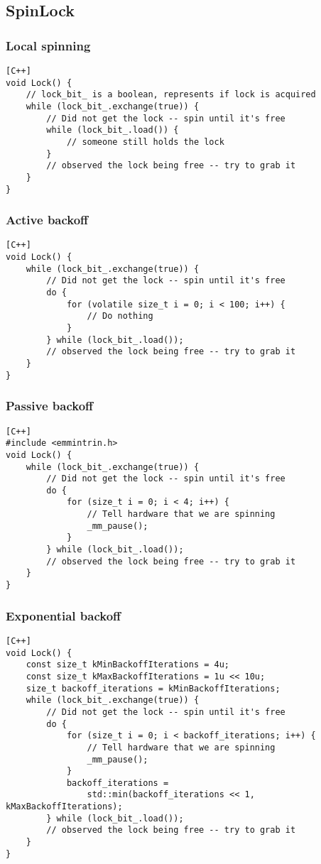 \documentclass[twocolumn,landscape,10pt]{article}
\theoremstyle{definition}
\begin{document}
\subsection{SpinLock}

\subsubsection{Local spinning}
\begin{lstlisting}[C++]
void Lock() { 
    // lock_bit_ is a boolean, represents if lock is acquired
    while (lock_bit_.exchange(true)) {
        // Did not get the lock -- spin until it's free
        while (lock_bit_.load()) {
            // someone still holds the lock
        }
        // observed the lock being free -- try to grab it
    }
}
\end{lstlisting} 
\smallskip
\subsubsection{Active backoff}
\begin{lstlisting}[C++]
void Lock() { 
    while (lock_bit_.exchange(true)) {
        // Did not get the lock -- spin until it's free
        do {
            for (volatile size_t i = 0; i < 100; i++) {
                // Do nothing
            }
        } while (lock_bit_.load());
        // observed the lock being free -- try to grab it
    }
}
\end{lstlisting} 
\smallskip
\subsubsection{Passive backoff}
\begin{lstlisting}[C++]
#include <emmintrin.h>
void Lock() { 
    while (lock_bit_.exchange(true)) {
        // Did not get the lock -- spin until it's free
        do {
            for (size_t i = 0; i < 4; i++) {
                // Tell hardware that we are spinning
                _mm_pause();
            }
        } while (lock_bit_.load());
        // observed the lock being free -- try to grab it
    }
}
\end{lstlisting} 
\smallskip
\subsubsection{Exponential backoff}
\begin{lstlisting}[C++]
void Lock() { 
    const size_t kMinBackoffIterations = 4u;
    const size_t kMaxBackoffIterations = 1u << 10u;
    size_t backoff_iterations = kMinBackoffIterations;
    while (lock_bit_.exchange(true)) {
        // Did not get the lock -- spin until it's free
        do {
            for (size_t i = 0; i < backoff_iterations; i++) {
                // Tell hardware that we are spinning
                _mm_pause();
            }
            backoff_iterations = 
                std::min(backoff_iterations << 1, kMaxBackoffIterations);
        } while (lock_bit_.load());
        // observed the lock being free -- try to grab it
    }
}
\end{lstlisting} 
\smallskip
\end{document}
